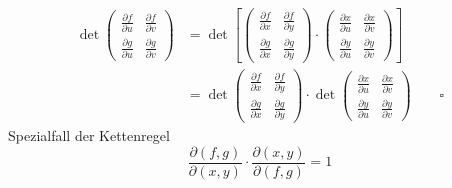 \begin{equation}
    \begin{split}
        \det
        \begin{pmatrix}
\frac{\partial f}{\partial u} & \frac{\partial f}{\partial v} \\
\frac{\partial g}{\partial u} & \frac{\partial g}{\partial v}
\end{pmatrix}
&= \det \left[
\begin{pmatrix}
\frac{\partial f}{\partial x} & \frac{\partial f}{\partial y} \\
\frac{\partial g}{\partial x} & \frac{\partial g}{\partial y}
\end{pmatrix}
\cdot
\begin{pmatrix}
\frac{\partial x}{\partial u} & \frac{\partial x}{\partial v} \\
\frac{\partial y}{\partial u} & \frac{\partial y}{\partial v}
\end{pmatrix}
\right] \\
&= \det
\begin{pmatrix}
\frac{\partial f}{\partial x} & \frac{\partial f}{\partial y} \\
\frac{\partial g}{\partial x} & \frac{\partial g}{\partial y}
\end{pmatrix}
\cdot \det
\begin{pmatrix}
\frac{\partial x}{\partial u} & \frac{\partial x}{\partial v} \\
\frac{\partial y}{\partial u} & \frac{\partial y}{\partial v}
\end{pmatrix} \qquad \square
    \end{split}
\end{equation}
Spezialfall der Kettenregel
\begin{equation}
    \frac{\partial(f, g)}{\partial(x, y)} \cdot \frac{\partial(x, y)}{\partial(f, g)} = 1
\end{equation}
